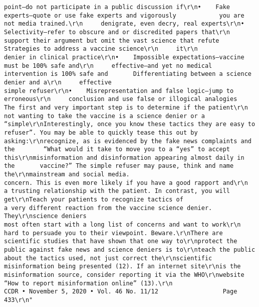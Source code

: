 \documentclass[
]{book}
\begin{document}
\begin{verbatim}
point—do not participate in a public discussion if\r\n•    Fake experts—quote or use fake experts and vigorously            you are not media trained.\r\n     denigrate, even decry, real experts\r\n•    Selectivity—refer to obscure and or discredited papers that\r\n     support their argument but omit the vast science that refute     Strategies to address a vaccine science\r\n     it\r\n                                                                      denier in clinical practice\r\n•    Impossible expectations—vaccine must be 100% safe and\r\n     effective—and yet no medical intervention is 100% safe and       Differentiating between a science denier and a\r\n     effective                                                        simple refuser\r\n•    Misrepresentation and false logic—jump to erroneous\r\n     conclusion and use false or illogical analogies                  The first and very important step is to determine if the patient\r\n                                                                      not wanting to take the vaccine is a science denier or a “simple\r\nInterestingly, once you know these tactics they are easy to           refuser”. You may be able to quickly tease this out by asking:\r\nrecognize, as is evidenced by the fake news complaints and the        “What would it take to move you to a “yes” to accept this\r\nmisinformation and disinformation appearing almost daily in the       vaccine?” The simple refuser may pause, think and name the\r\nmainstream and social media.                                          concern. This is even more likely if you have a good rapport and\r\n                                                                      a trusting relationship with the patient. In contrast, you will get\r\nTeach your patients to recognize tactics of                           a very different reaction from the vaccine science denier. They\r\nscience deniers                                                       most often start with a long list of concerns and want to work\r\n                                                                      hard to persuade you to their viewpoint. Beware.\r\nThere are scientific studies that have shown that one way to\r\nprotect the public against fake news and science deniers is to\r\nteach the public about the tactics used, not just correct the\r\nscientific misinformation being presented (12). If an internet site\r\nis the misinformation source, consider reporting it via the WHO\r\nwebsite “How to report misinformation online” (13).\r\n                                                                   CCDR • November 5, 2020 • Vol. 46 No. 11/12                  Page 433\r\n"                                                                                      

\end{verbatim}
\end{document}
